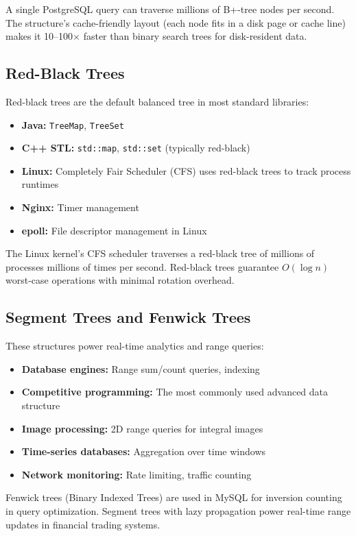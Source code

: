 A single PostgreSQL query can traverse millions of B+-tree nodes per second. The structure's cache-friendly layout (each node fits in a disk page or cache line) makes it 10--100$\times$ faster than binary search trees for disk-resident data.

\subsection{Red-Black Trees}

Red-black trees are the default balanced tree in most standard libraries:
\begin{itemize}
    \item \textbf{Java:} \texttt{TreeMap}, \texttt{TreeSet}
    \item \textbf{C++ STL:} \texttt{std::map}, \texttt{std::set} (typically red-black)
    \item \textbf{Linux:} Completely Fair Scheduler (CFS) uses red-black trees to track process runtimes
    \item \textbf{Nginx:} Timer management
    \item \textbf{epoll:} File descriptor management in Linux
\end{itemize}

The Linux kernel's CFS scheduler traverses a red-black tree of millions of processes millions of times per second. Red-black trees guarantee $O(\log n)$ worst-case operations with minimal rotation overhead.

\subsection{Segment Trees and Fenwick Trees}

These structures power real-time analytics and range queries:
\begin{itemize}
    \item \textbf{Database engines:} Range sum/count queries, indexing
    \item \textbf{Competitive programming:} The most commonly used advanced data structure
    \item \textbf{Image processing:} 2D range queries for integral images
    \item \textbf{Time-series databases:} Aggregation over time windows
    \item \textbf{Network monitoring:} Rate limiting, traffic counting
\end{itemize}

Fenwick trees (Binary Indexed Trees) are used in MySQL for inversion counting in query optimization. Segment trees with lazy propagation power real-time range updates in financial trading systems.

